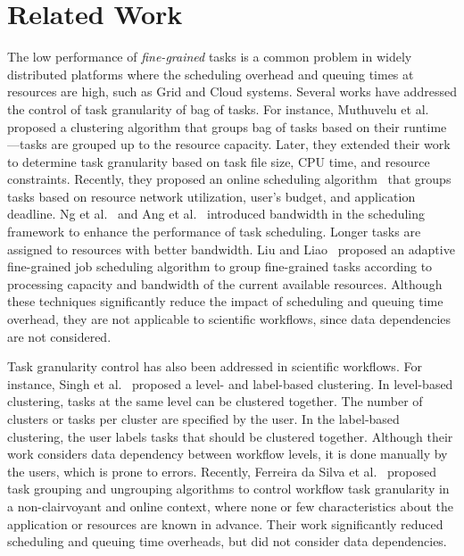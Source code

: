 \section{Related Work}

The low performance of \emph{fine-grained} tasks is a common problem in widely distributed platforms where the scheduling overhead and queuing times at resources are high, such as Grid and Cloud systems. Several works have addressed the control of task granularity of bag of tasks. For instance, Muthuvelu et al.~\cite{Muthuvelu:2005:DJG:1082290.1082297} proposed a clustering algorithm that groups bag of tasks based on their runtime---tasks are grouped up to the resource capacity. Later, they extended their work~\cite{4493929} to determine task granularity based on task file size, CPU time, and resource constraints. Recently, they proposed an online scheduling algorithm~\cite{Muthuvelu2010,Muthuvelu2013170} that groups tasks based on resource network utilization, user's budget, and application deadline. Ng et al.~\cite{keat-2006} and Ang et al.~\cite{ang-2009} introduced bandwidth in the scheduling framework to enhance the performance of task scheduling. Longer tasks are assigned to resources with better bandwidth. Liu and Liao~\cite{4958835} proposed an adaptive fine-grained job scheduling algorithm to group fine-grained tasks according to processing capacity and bandwidth of the current available resources. Although these techniques significantly reduce the impact of scheduling and queuing time overhead, they are not applicable to scientific workflows, since data dependencies are not considered.

Task granularity control has also been addressed in scientific workflows. For instance, Singh et al.~\cite{Singh:2008:WTC:1341811.1341822} proposed a level- and label-based clustering. In level-based clustering, tasks at the same level can be clustered together. The number of clusters or tasks per cluster are specified by the user. In the label-based clustering, the user labels tasks that should be clustered together. Although their work considers data dependency between workflow levels, it is done manually by the users, which is prone to errors. Recently, Ferreira da Silva et al.~\cite{europar-granularity} proposed task grouping and ungrouping algorithms to control workflow task granularity in a non-clairvoyant and online context, where none or few characteristics about the application or resources are known in advance. Their work significantly reduced scheduling and queuing time overheads, but did not consider data dependencies.


